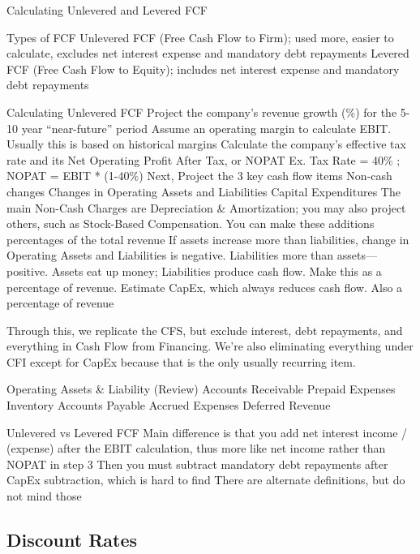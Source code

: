 \documentclass[10pt]{article}
\begin{document}
    \begin{core}{Calculating Unlevered and Levered FCF}

      Types of FCF
      Unlevered FCF (Free Cash Flow to Firm); used more, easier to calculate, excludes net interest expense and mandatory debt repayments
      Levered FCF (Free Cash Flow to Equity); includes net interest expense and mandatory debt repayments

      Calculating Unlevered FCF
      Project the company’s revenue growth (\%) for the 5-10 year “near-future” period
      Assume an operating margin to calculate EBIT. Usually this is based on historical margins
      Calculate the company’s effective tax rate and its Net Operating Profit After Tax, or NOPAT
      Ex. Tax Rate = 40\% ; NOPAT = EBIT * (1-40\%)
      Next, Project the 3 key cash flow items
      Non-cash changes
      Changes in Operating Assets and Liabilities
      Capital Expenditures
      The main Non-Cash Charges are Depreciation \& Amortization; you may also project others, such as Stock-Based Compensation. You can make these additions percentages of the total revenue
      If assets increase more than liabilities, change in Operating Assets and Liabilities is negative. Liabilities more than assets—positive. Assets eat up money; Liabilities produce cash flow. Make this as a percentage of revenue.
      Estimate CapEx, which always reduces cash flow. Also a percentage of revenue

      Through this, we replicate the CFS, but exclude interest, debt repayments, and everything in Cash Flow from Financing. We’re also eliminating everything under CFI except for CapEx because that is the only usually recurring item.

      Operating Assets \& Liability (Review)
      Accounts Receivable
      Prepaid Expenses
      Inventory
      Accounts Payable
      Accrued Expenses
      Deferred Revenue

      Unlevered vs Levered FCF
      Main difference is that you add net interest income / (expense) after the EBIT calculation, thus more like net income rather than NOPAT in step 3
      Then you must subtract mandatory debt repayments after CapEx subtraction, which is hard to find
      There are alternate definitions, but do not mind those

    \end{core}

  \subsection{Discount Rates}
\end{document}
